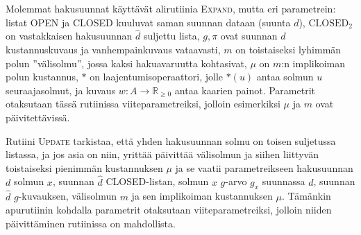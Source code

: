 \documentclass[finnish]{tktltiki2}
\theoremstyle{definition}
\theoremstyle{remark}
\begin{document}
Molemmat hakusuunnat käyttävät alirutiinia \textsc{Expand}, mutta eri parametrein: listat OPEN ja CLOSED kuuluvat saman suunnan dataan (suunta $d$), $\text{CLOSED}_2$ on vastakkaisen hakusuunnan $\hat{d}$ suljettu lista, $g, \pi$ ovat suunnan $d$ kustannuskuvaus ja vanhempainkuvaus vataavasti, $m$ on toistaiseksi lyhimmän polun ''välisolmu'', jossa kaksi hakuavaruutta kohtasivat, $\mu$ on $m$:n implikoiman polun kustannus, $\ast$ on laajentumisoperaattori, jolle $\ast(u)$ antaa solmun $u$ seuraajasolmut, ja kuvaus $w \colon A \to \mathbb{R}_{\geq 0}$ antaa kaarien painot. Parametrit otaksutaan tässä rutiinissa viiteparametreiksi, jolloin esimerkiksi $\mu$ ja $m$ ovat päivitettävissä. 

Rutiini \textsc{Update} tarkistaa, että yhden hakusuunnan solmu on toisen suljetussa listassa, ja jos asia on niin, yrittää päivittää välisolmun ja siihen liittyvän toistaiseksi pienimmän kustannuksen $\mu$ ja se vaatii parametreikseen hakusuunnan $d$ solmun $x$, suunnan $\hat{d}$ CLOSED-listan, solmun $x$ $g$-arvo $g_x$ suunnassa $d$, suunnan $\hat{d}$ $g$-kuvauksen, välisolmun $m$ ja sen implikoiman kustannuksen $\mu$. Tämänkin apurutiinin kohdalla parametrit otaksutaan viiteparametreiksi, jolloin niiden päivittäminen rutiinissa on mahdollista.
\end{document}
